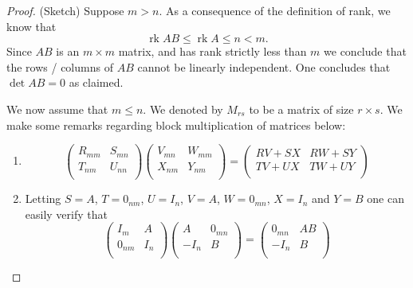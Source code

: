 \documentclass[10pt, letterpaper]{article}
\theoremstyle{remark}
\theoremstyle{definition}
\begin{document}
    \begin{proof}(Sketch)
        Suppose $m > n$. As a consequence of the definition of rank, we know that
        \[
            \operatorname{rk} AB \leq \operatorname{rk} A \leq n < m.
        \]
        Since $AB$ is an $m \times m$ matrix, and has rank strictly less than $m$ we conclude that the rows / columns
        of $AB$ cannot be linearly independent. One concludes that $\det AB = 0$ as claimed.

        We now assume that $m \leq n$. We denoted by $M_{rs}$ to be a matrix of size $r \times s$. We make some remarks
        regarding block multiplication of matrices below:

        \begin{enumerate}
            \item
            \[
                \begin{pmatrix}
                    R_{mm} & S_{mn} \\
                    T_{nm} & U_{nn} \\
                \end{pmatrix}
                \begin{pmatrix}
                    V_{mn} & W_{mm} \\
                    X_{nm} & Y_{nm} \\
                \end{pmatrix} =
                \begin{pmatrix}
                    RV+SX & RW + SY \\
                    TV+UX & TW + UY \\
                \end{pmatrix}
            \]
            \item Letting $S = A$, $T = 0_{nm}$, $U = I_n$, $V = A$, $W = 0_{mn}$, $X = I_n$ and $Y = B$ one can easily
            verify that
            \[
                \begin{pmatrix}
                    I_m & A \\
                    0_{nm} & I_n \\
                \end{pmatrix}
                \begin{pmatrix}
                    A & 0_{mn} \\
                    -I_n & B \\
                \end{pmatrix} =
                \begin{pmatrix}
                    0_{mn} & AB \\
                    -I_n & B \\
                \end{pmatrix}
            \]


\end{enumerate}
\end{proof}
\end{document}
